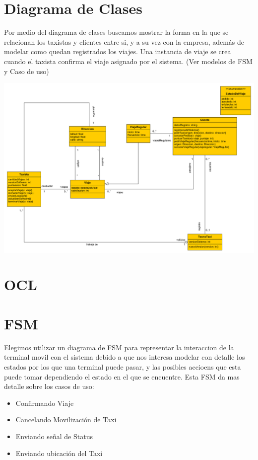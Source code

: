 \documentclass[a4paper]{article}
\begin{document}
\section{Diagrama de Clases}
Por medio del diagrama de clases buscamos mostrar la forma en la que se relacionan los taxistas y clientes entre si, y a su vez con la empresa, adem\'as
de modelar como quedan registrados los viajes. Una instancia de viaje se crea cuando el taxista confirma el viaje asignado por el sistema. (Ver modelos de FSM y Caso de uso)


\begin{center}
\includegraphics[scale=.38]{diag_Clases.pdf}
\end{center}

\newpage
\section{OCL}


\section{FSM}

Elegimos utilizar un diagrama de FSM para representar la interaccion de la terminal movil con el sistema debido a que nos interesa modelar
con detalle los estados por los que una terminal puede pasar, y las posibles accioens que esta puede tomar dependiendo el estado en el que se encuentre.
Esta FSM da mas detalle sobre los casos de uso:
\begin{itemize}
\item Confirmando Viaje
\item Cancelando Movilizaci\'on de Taxi
\item Enviando se\~nal de Status
\item Enviando ubicaci\'on del Taxi
\end{itemize}
\end{document}
